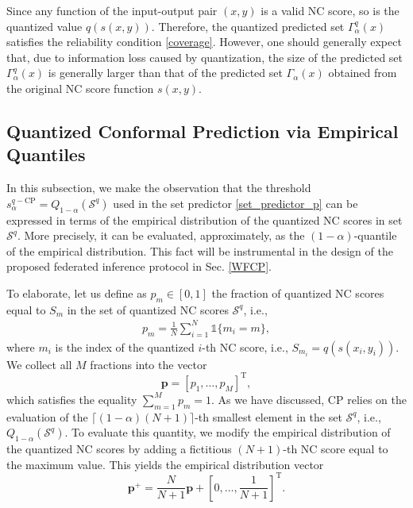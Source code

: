 \documentclass[12pt, draftclsnofoot, onecolumn]{IEEEtran}
\begin{document}
Since any function of the input-output pair $(x,y)$ is a valid NC score, so is the quantized value $q(s(x,y))$. Therefore, the quantized predicted set $ \Gamma^q_{\alpha}(x)$ satisfies the reliability condition \eqref{coverage}.  However, one should generally expect that, due to information loss caused by quantization, the size of the predicted set $ \Gamma^q_{\alpha}(x)$ is generally larger than that of the predicted set $ \Gamma_{\alpha}(x)$ obtained from the original NC score function $s(x,y)$.

\subsection{Quantized Conformal Prediction via Empirical Quantiles}\label{quantile by distribution}
In this subsection, we make the observation that the threshold $s^{q-\text{CP}}_{\alpha} = Q_{1-\alpha}(\mathcal{S}^q)$ used in the set predictor \eqref{set_predictor_p} can be expressed in terms of the empirical distribution of the quantized NC scores in set $\mathcal{S}^q$. More precisely, it can be evaluated, approximately, as the $(1-\alpha)$-quantile of the empirical distribution. This fact will be instrumental in the design of the proposed federated inference protocol in Sec. \ref{WFCP}.

To elaborate, let us define as $p_m\in[0,1]$ the fraction of quantized NC scores equal to $S_m$ in the set of quantized NC scores $\mathcal{S}^q$, i.e.,
\begin{align}
    p_{m}=\frac{1}{N}\sum^{N}_{i=1}\mathds{1}\{m_{i}=m\},
\end{align}
where $m_i$ is the index of the quantized $i$-th NC score, i.e., $S_{m_i}=q(s(x_i,y_i))$. We collect all $M$ fractions into the vector
\begin{equation}\label{eq:boldp}
    \boldsymbol{p}=[p_1,\ldots,p_M]^{\mathrm{T}},
\end{equation}
which satisfies the equality  $\sum_{m=1}^M p_m=1$. As we have discussed, CP relies on the evaluation of the $\lceil(1-\alpha)(N+1)\rceil$-th smallest element in the set $\mathcal{S}^q$, i.e., $ Q_{1-\alpha}(\mathcal{S}^q)$. To evaluate this quantity, we modify the empirical distribution of the quantized NC scores by adding a fictitious $(N+1)$-th NC score equal to the maximum value. This yields the empirical distribution vector 
\begin{equation}\label{p+}
    \boldsymbol{p}^{+}=\frac{N}{N+1}\boldsymbol{p} + \left[0,\ldots,\frac{1}{N+1}\right]^{\mathrm{T}}.
\end{equation}
\end{document}
